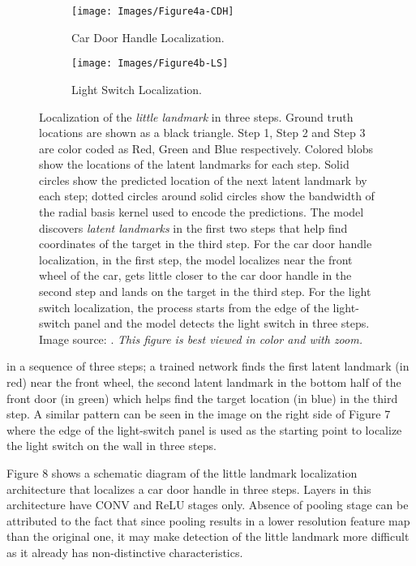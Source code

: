 \documentclass [11pt,letterpaper ,twoside ,openany ]{report}
\begin{document}
    \begin{figure}[h!]
    \centering
        \begin{subfigure}[b]{0.45\linewidth}
            \texttt{[image: Images/Figure4a-CDH]}
            \caption{Car Door Handle Localization.}
        \end{subfigure}
        \begin{subfigure}[b]{0.45\linewidth}
            \texttt{[image: Images/Figure4b-LS]}
            \caption{Light Switch Localization.}
        \end{subfigure}
        \caption{Localization of the \textit{little landmark} in three steps. Ground truth locations are shown as a black triangle. Step 1, Step 2 and Step 3 are color coded as Red, Green and Blue respectively. Colored blobs show the locations of the latent landmarks for each step. Solid circles show the predicted location of the next latent landmark by each step; dotted circles around solid circles show the bandwidth of the radial basis kernel used to encode the predictions. The model discovers \textit{latent landmarks} in the first two steps that help find coordinates of the target in the third step. For the car door handle localization, in the first step, the model localizes near the front wheel of the car, gets little closer to the car door handle in the second step and lands on the target in the third step. For the light switch localization, the process starts from the edge of the light-switch panel and the model detects the light switch in three steps. Image source: \cite{Singh_2016_CVPR}. \textit{This figure is best viewed in color and with zoom.}}
        \label{fig:localization}
    \end{figure}

    \noindent
     in a sequence of three steps; a trained network finds the first latent landmark (in red) near the front wheel, the second latent landmark in the bottom half of the front door (in green) which helps find the target location (in blue) in the third step. A similar pattern can be seen in the image on the right side of Figure 7 where the edge of the light-switch panel is used as the starting point to localize the light switch on the wall in three steps.

    Figure 8 shows a schematic diagram of the little landmark localization architecture that localizes a car door handle in three steps. Layers in this architecture have CONV and ReLU stages only. Absence of pooling stage can be attributed to the fact that since pooling results in a lower resolution feature map than the original one, it may make detection of the little landmark more difficult as it already has non-distinctive characteristics. 
\end{document}
